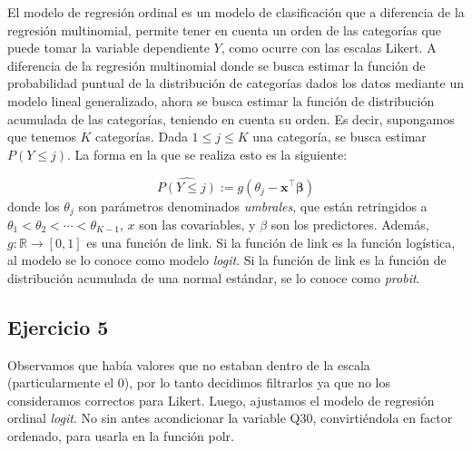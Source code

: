 \documentclass[
]{article}
\begin{document}
El modelo de regresión ordinal es un modelo de clasificación que a
diferencia de la regresión multinomial, permite tener en cuenta un orden
de las categorías que puede tomar la variable dependiente \(Y\), como
ocurre con las escalas Likert. A diferencia de la regresión multinomial
donde se busca estimar la función de probabilidad puntual de la
distribución de categorías dados los datos mediante un modelo lineal
generalizado, ahora se busca estimar la función de distribución
acumulada de las categorías, teniendo en cuenta su orden. Es decir,
supongamos que tenemos \(K\) categorías. Dada \(1 \leq j \leq K\) una
categoría, se busca estimar \(P(Y \leq j)\). La forma en la que se
realiza esto es la siguiente:

\[
\widehat{P(Y \leq j)} := g(\theta_j - \mathbf{x}^\top \boldsymbol{\beta})
\] donde los \(\theta_j\) son parámetros denominados \emph{umbrales},
que están retringidos a \(\theta_1 < \theta_2 < \cdots < \theta_{K-1}\),
\(x\) son las covariables, y \(\beta\) son los predictores. Además,
\(g:\mathbb{R} \to [0, 1]\) es una función de link. Si la función de
link es la función logística, al modelo se lo conoce como modelo
\emph{logit}. Si la función de link es la función de distribución
acumulada de una normal estándar, se lo conoce como \emph{probit}.

\subsection{Ejercicio 5}\label{ejercicio-5}

Observamos que había valores que no estaban dentro de la escala
(particularmente el 0), por lo tanto decidimos filtrarlos ya que no los
consideramos correctos para Likert. Luego, ajustamos el modelo de
regresión ordinal \emph{logit}. No sin antes acondicionar la variable
Q30, convirtiéndola en factor ordenado, para usarla en la función polr.
\end{document}

